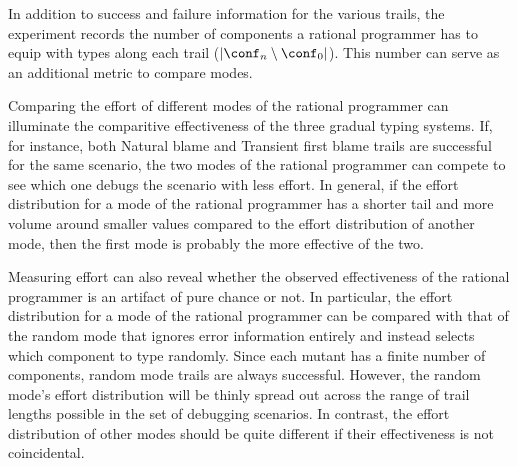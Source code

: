 
In addition to success and failure information for the various trails, the
experiment records the number of components a rational programmer has
to equip with types along each trail ($\lvert \conf_n \setminus \conf_0
\rvert$). This number can serve as an additional metric to compare modes.

Comparing the effort of different modes of the rational programmer can
illuminate the comparitive effectiveness of the three gradual typing
systems. If, for instance, both
Natural blame and Transient first blame trails are successful for the same scenario, the two modes of
the rational programmer can compete to see which one debugs the
scenario with less effort. In general, if the effort distribution for a mode of
the rational programmer has a shorter tail and more volume around smaller values
compared to the effort distribution of another mode, then the first mode is
probably the more effective of the two.

Measuring effort can also reveal whether the observed effectiveness of the
rational programmer is an artifact of pure chance or not.
In particular, the effort distribution for a mode of the rational programmer can be compared with that of
the random mode that ignores error information entirely and instead selects which
component to type randomly.  Since each mutant has a finite number of
components, random mode trails are always successful. However, the random mode's effort
distribution will be thinly spread out across the range of trail lengths possible
in the set of debugging scenarios.
In contrast, the effort distribution of other modes should be quite different if their effectiveness is not coincidental.

